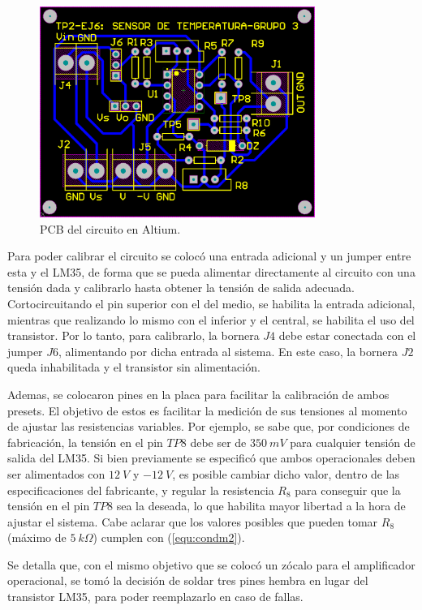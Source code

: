 \begin{figure}[H]
	\centering
	\includegraphics[width=0.8\textwidth]{Ejercicio6/Imagenes/PCB.png}
	\caption{PCB del circuito en Altium.}
	\label{fig:PCB}
\end{figure}

Para poder calibrar el circuito se colocó una entrada adicional y un jumper entre esta y el LM35, de forma que se pueda alimentar directamente al circuito con una tensión dada y calibrarlo hasta obtener la tensión de salida adecuada. Cortocircuitando el pin superior con el del medio, se habilita la entrada adicional, mientras que realizando lo mismo con el inferior y el central, se habilita el uso del transistor. Por lo tanto, para calibrarlo, la bornera $J4$ debe estar conectada con el jumper $J6$, alimentando por dicha entrada al sistema. En este caso, la bornera $J2$ queda inhabilitada y el transistor sin alimentación.

Ademas, se colocaron pines en la placa para facilitar la calibración de ambos presets. El objetivo de estos es facilitar la medición de sus tensiones al momento de ajustar las resistencias variables. Por ejemplo, se sabe que, por condiciones de fabricación, la tensión en el pin $TP8$ debe ser de $350 \ mV$ para cualquier tensión de salida del LM35. Si bien previamente se especificó que ambos operacionales deben ser alimentados con $12 \ V$ y $-12 \ V$, es posible cambiar dicho valor, dentro de las especificaciones del fabricante, y regular la resistencia $R_8$ para conseguir que la tensión en el pin $TP8$ sea la deseada, lo que habilita mayor libertad a la hora de ajustar el sistema. Cabe aclarar que los valores posibles que pueden tomar $R_8$ (máximo de $5 \ k\Omega$) cumplen con (\ref{equ:condm2}).

Se detalla que, con el mismo objetivo que se colocó un zócalo para el amplificador operacional, se tomó la decisión de soldar tres pines hembra en lugar del transistor LM35, para poder reemplazarlo en caso de fallas.

